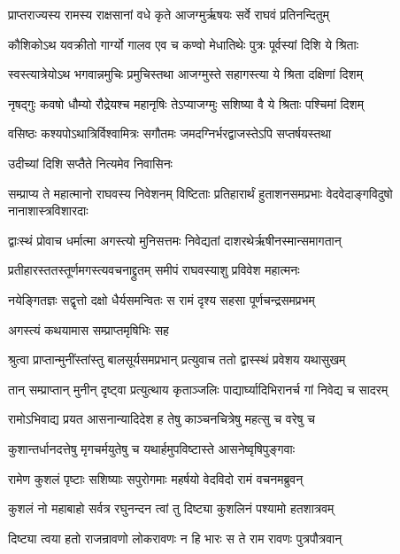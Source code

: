 
\twolineshloka
{प्राप्तराज्यस्य रामस्य राक्षसानां वधे कृते}
{आजग्मुर्ऋषयः सर्वे राघवं प्रतिनन्दितुम्} %

\twolineshloka
{कौशिकोऽथ यवक्रीतो गार्ग्यो गालव एव च}
{कण्वो मेधातिथेः पुत्रः पूर्वस्यां दिशि ये श्रिताः} %

\twolineshloka
{स्वस्त्यात्रेयोऽथ भगवान्नमुचिः प्रमुचिस्तथा}
{आजग्मुस्ते सहागस्त्या ये श्रिता दक्षिणां दिशम्} %

\twolineshloka
{नृषद्गुः कवषो धौम्यो रौद्रेयश्च महानृषिः}
{तेऽप्याजग्मुः सशिष्या वै ये श्रिताः पश्चिमां दिशम्} %

\twolineshloka
{वसिष्ठः कश्यपोऽथात्रिर्विश्वामित्रः सगौतमः}
{जमदग्निर्भरद्वाजस्तेऽपि सप्तर्षयस्तथा} %

\onelineshloka
{उदीच्यां दिशि सप्तैते नित्यमेव निवासिनः} %

\threelineshloka
{सम्प्राप्य ते महात्मानो राघवस्य निवेशनम्}
{विष्टिताः प्रतिहारार्थं हुताशनसमप्रभाः}
{वेदवेदाङ्गविदुषो नानाशास्त्रविशारदाः} %

\twolineshloka
{द्वाःस्थं प्रोवाच धर्मात्मा अगस्त्यो मुनिसत्तमः}
{निवेद्यतां दाशरथेर्ऋषीनस्मान्समागतान्} %

\twolineshloka
{प्रतीहारस्ततस्तूर्णमगस्त्यवचनाद्द्रुतम्}
{समीपं राघवस्याशु प्रविवेश महात्मनः} %

\twolineshloka
{नयेङ्गितज्ञः सद्वृत्तो दक्षो धैर्यसमन्वितः}
{स रामं दृश्य सहसा पूर्णचन्द्रसमप्रभम्} %

\onelineshloka
{अगस्त्यं कथयामास सम्प्राप्तमृषिभिः सह} %

\twolineshloka
{श्रुत्वा प्राप्तान्मुनींस्तांस्तु बालसूर्यसमप्रभान्}
{प्रत्युवाच ततो द्वास्स्थं प्रवेशय यथासुखम्} %

\twolineshloka
{तान् सम्प्राप्तान् मुनीन् दृष्ट्वा प्रत्युत्थाय कृताञ्जलिः}
{पाद्यार्घ्यादिभिरानर्च गां निवेद्य च सादरम्} %

\twolineshloka
{रामोऽभिवाद्य प्रयत आसनान्यादिदेश ह}
{तेषु काञ्चनचित्रेषु महत्सु च वरेषु च} %

\twolineshloka
{कुशान्तर्धानदत्तेषु मृगचर्मयुतेषु च}
{यथार्हमुपविष्टास्ते आसनेष्वृषिपुङ्गवाः} %

\twolineshloka
{रामेण कुशलं पृष्टाः सशिष्याः सपुरोगमाः}
{महर्षयो वेदविदो रामं वचनमब्रुवन्} %

\twolineshloka
{कुशलं नो महाबाहो सर्वत्र रघुनन्दन}
{त्वां तु दिष्ट्या कुशलिनं पश्यामो हतशात्रवम्} %

\twolineshloka
{दिष्ट्या त्वया हतो राजन्रावणो लोकरावणः}
{न हि भारः स ते राम रावणः पुत्रपौत्रवान्} %

